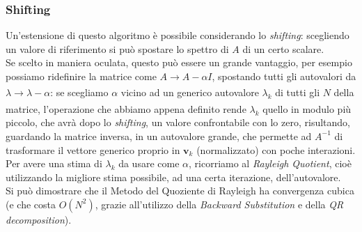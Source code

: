 \documentclass[11pt, a4paper]{article}
\begin{document}
\subsubsection{Shifting}
Un'estensione di questo algoritmo è possibile considerando lo \textit{shifting}: scegliendo un valore di riferimento si può spostare lo spettro di $A$ di un certo scalare.\\
Se scelto in maniera oculata, questo può essere un grande vantaggio, per esempio possiamo ridefinire la matrice come $A \xrightarrow[]{}A - \alpha I$, spostando tutti gli autovalori da $\lambda \xrightarrow[]{}\lambda - \alpha$: se scegliamo $\alpha$ vicino ad un generico autovalore $\lambda_k$ di tutti gli $N$ della matrice, l'operazione che abbiamo appena definito rende $\lambda_k$ quello in modulo più piccolo, che avrà dopo lo \textit{shifting}, un valore confrontabile con lo zero, risultando, guardando la matrice inversa, in un autovalore grande, che permette ad $A^{-1}$ di trasformare il vettore generico proprio in $\boldsymbol{v}_k$ (normalizzato) con poche interazioni.\\
Per avere una stima di $\lambda_k$ da usare come $\alpha$, ricorriamo al \textit{Rayleigh Quotient}, cioè utilizzando la migliore stima possibile, ad una certa iterazione, dell'autovalore.\\
\noindent Si può dimostrare che il Metodo del Quoziente di Rayleigh ha convergenza cubica (e che costa $O(N^2)$, grazie all'utilizzo della \textit{Backward Substitution} e della \textit{QR decomposition}).
\end{document}
